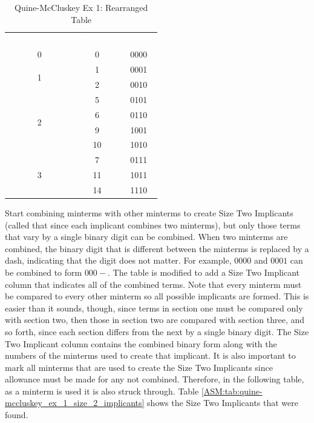 \begin{table}[H]
	\sffamily
	\newcommand{\head}[1]{\textcolor{white}{\textbf{#1}}}		
	\begin{center}
		\begin{tabular}{ccc} 
			\rowcolor{black!75}
			\head{Number of 1's} & \head{Minterm} & \head{Binary} \\
			0 & 0 & 0000 \\
			\hline
			\multirow{2}{*}{1} & 1 & 0001 \\
							   & 2 & 0010 \\
			\hline
			\multirow{4}{*}{2} & 5  & 0101 \\
							   & 6  & 0110 \\		
							   & 9  & 1001 \\		
							   & 10 & 1010 \\
			\hline
			\multirow{3}{*}{3} & 7  & 0111 \\
							   & 11 & 1011 \\		
							   & 14 & 1110 \\
			\hline
		\end{tabular}
	\end{center}
	\caption{Quine-McCluskey Ex 1: Rearranged Table}
  \label{ASM:tab:qm_ex_1_rearranged_table}
\end{table}

Start combining minterms with other minterms to create Size Two Implicants (called that since each implicant combines two minterms), but only those terms that vary by a single binary digit can be combined. When two minterms are combined, the binary digit that is different between the minterms is replaced by a dash, indicating that the digit does not matter. For example, $ 0000 $ and $ 0001 $ can be combined to form $ 000- $. The table is modified to add a Size Two Implicant column that indicates all of the combined terms. Note that every minterm must be compared to every other minterm so all possible implicants are formed. This is easier than it sounds, though, since terms in section one must be compared only with section two, then those in section two are compared with section three, and so forth, since each section differs from the next by a single binary digit. The Size Two Implicant column contains the combined binary form along with the numbers of the minterms used to create that implicant. It is also important to mark all minterms that are used to create the Size Two Implicants since allowance must be made for any not combined. Therefore, in the following table, as a minterm is used it is also struck through. Table \ref{ASM:tab:quine-mccluskey_ex_1_size_2_implicants} shows the Size Two Implicants that were found.

